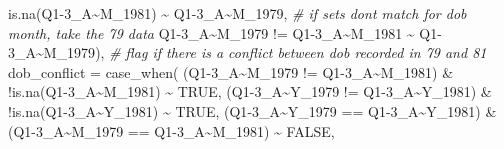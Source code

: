 \documentclass{article}
\newenvironment{Shaded}{\begin{snugshade}}{\end{snugshade}}
\newcommand{\AttributeTok}[1]{\textcolor[rgb]{0.77,0.63,0.00}{#1}}
\newcommand{\CommentTok}[1]{\textcolor[rgb]{0.56,0.35,0.01}{\textit{#1}}}
\newcommand{\ConstantTok}[1]{\textcolor[rgb]{0.00,0.00,0.00}{#1}}
\newcommand{\FunctionTok}[1]{\textcolor[rgb]{0.00,0.00,0.00}{#1}}
\newcommand{\NormalTok}[1]{#1}
\newcommand{\SpecialCharTok}[1]{\textcolor[rgb]{0.00,0.00,0.00}{#1}}
\newcommand{\StringTok}[1]{\textcolor[rgb]{0.31,0.60,0.02}{#1}}
\begin{document}
\begin{Shaded}
\begin{Highlighting}[]
                      \FunctionTok{is.na}\NormalTok{(}\StringTok{\textasciigrave{}}\AttributeTok{Q1{-}3\_A\textasciitilde{}M\_1981}\StringTok{\textasciigrave{}}\NormalTok{) }\SpecialCharTok{\textasciitilde{}} \StringTok{\textasciigrave{}}\AttributeTok{Q1{-}3\_A\textasciitilde{}M\_1979}\StringTok{\textasciigrave{}}\NormalTok{,}
                      \CommentTok{\# if sets don\textquotesingle{}t match for dob month, take the 79 data}
                      \StringTok{\textasciigrave{}}\AttributeTok{Q1{-}3\_A\textasciitilde{}M\_1979}\StringTok{\textasciigrave{}} \SpecialCharTok{!=} \StringTok{\textasciigrave{}}\AttributeTok{Q1{-}3\_A\textasciitilde{}M\_1981}\StringTok{\textasciigrave{}} \SpecialCharTok{\textasciitilde{}} \StringTok{\textasciigrave{}}\AttributeTok{Q1{-}3\_A\textasciitilde{}M\_1979}\StringTok{\textasciigrave{}}\NormalTok{),}
         \CommentTok{\# flag if there is a conflict between dob recorded in 79 and 81}
         \AttributeTok{dob\_conflict =} \FunctionTok{case\_when}\NormalTok{(}
\NormalTok{                      (}\StringTok{\textasciigrave{}}\AttributeTok{Q1{-}3\_A\textasciitilde{}M\_1979}\StringTok{\textasciigrave{}} \SpecialCharTok{!=} \StringTok{\textasciigrave{}}\AttributeTok{Q1{-}3\_A\textasciitilde{}M\_1981}\StringTok{\textasciigrave{}}\NormalTok{) }\SpecialCharTok{\&} \SpecialCharTok{!}\FunctionTok{is.na}\NormalTok{(}\StringTok{\textasciigrave{}}\AttributeTok{Q1{-}3\_A\textasciitilde{}M\_1981}\StringTok{\textasciigrave{}}\NormalTok{)}
                      \SpecialCharTok{\textasciitilde{}} \ConstantTok{TRUE}\NormalTok{,}
\NormalTok{                      (}\StringTok{\textasciigrave{}}\AttributeTok{Q1{-}3\_A\textasciitilde{}Y\_1979}\StringTok{\textasciigrave{}} \SpecialCharTok{!=} \StringTok{\textasciigrave{}}\AttributeTok{Q1{-}3\_A\textasciitilde{}Y\_1981}\StringTok{\textasciigrave{}}\NormalTok{) }\SpecialCharTok{\&} \SpecialCharTok{!}\FunctionTok{is.na}\NormalTok{(}\StringTok{\textasciigrave{}}\AttributeTok{Q1{-}3\_A\textasciitilde{}Y\_1981}\StringTok{\textasciigrave{}}\NormalTok{)}
                      \SpecialCharTok{\textasciitilde{}} \ConstantTok{TRUE}\NormalTok{,}
\NormalTok{                      (}\StringTok{\textasciigrave{}}\AttributeTok{Q1{-}3\_A\textasciitilde{}Y\_1979}\StringTok{\textasciigrave{}} \SpecialCharTok{==} \StringTok{\textasciigrave{}}\AttributeTok{Q1{-}3\_A\textasciitilde{}Y\_1981}\StringTok{\textasciigrave{}}\NormalTok{) }\SpecialCharTok{\&}
\NormalTok{                        (}\StringTok{\textasciigrave{}}\AttributeTok{Q1{-}3\_A\textasciitilde{}M\_1979}\StringTok{\textasciigrave{}} \SpecialCharTok{==} \StringTok{\textasciigrave{}}\AttributeTok{Q1{-}3\_A\textasciitilde{}M\_1981}\StringTok{\textasciigrave{}}\NormalTok{) }\SpecialCharTok{\textasciitilde{}} \ConstantTok{FALSE}\NormalTok{,}

\end{Highlighting}
\end{Shaded}
\end{document}
